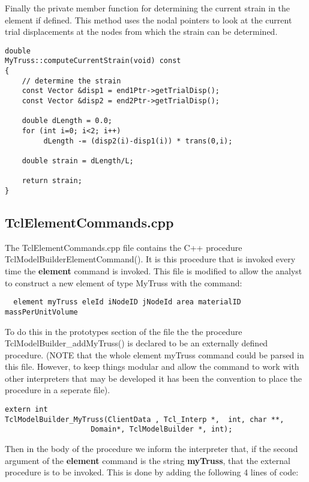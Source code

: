 \documentclass[12pt]{article}
\begin{document}
Finally the private member function for determining the current strain
in the element if defined. This method uses the nodal pointers to look
at the current trial displacements at the nodes from which the strain
can be determined. 

{\sf\small
\begin{verbatim}
double
MyTruss::computeCurrentStrain(void) const
{
    // determine the strain
    const Vector &disp1 = end1Ptr->getTrialDisp();
    const Vector &disp2 = end2Ptr->getTrialDisp();	

    double dLength = 0.0;
    for (int i=0; i<2; i++)
         dLength -= (disp2(i)-disp1(i)) * trans(0,i);
    
    double strain = dLength/L;

    return strain;
}
\end{verbatim} }

\subsection {\sf TclElementCommands.cpp}
The TclElementCommands.cpp file contains the C++ procedure 
TclModelBuilderElementCommand(). It is this procedure that is invoked every 
time the {\bf element} command is invoked. This file is modified to allow 
the analyst to construct a new element of type MyTruss with the command:
{\sf \begin{verbatim}
  element myTruss eleId iNodeID jNodeId area materialID massPerUnitVolume
\end{verbatim} } 
\noindent To do this in the prototypes section of the file the
the procedure TclModelBuilder\_addMyTruss() is declared to be an externally defined 
procedure. (NOTE that the whole element myTruss command could be parsed in this file. 
However, to keep things modular and allow the command to work with other interpreters 
that may be developed it has been the convention to place the
procedure in a seperate file).    

{\sf \begin{verbatim}
extern int
TclModelBuilder_MyTruss(ClientData , Tcl_Interp *,  int, char **,
	                Domain*, TclModelBuilder *, int);
\end{verbatim} } 

Then in the body of the procedure we inform the interpreter that, if the second argument
of the {\bf element} command is the string {\bf myTruss}, that the
external procedure is to be invoked. This is done by adding the
following 4 lines of code: 
\end{document}
